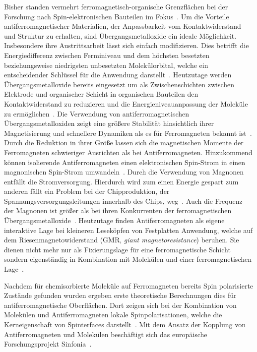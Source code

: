     Bisher standen vermehrt ferromagnetisch-organische Grenzflächen bei der Forschung nach Spin-elektronischen Bauteilen im Fokus~\cite{ma-DJ}.
    Um die Vorteile antiferromagnetischer Materialien, der Anpassbarkeit vom Kontaktwiderstand und Struktur zu erhalten, sind Übergangsmetalloxide ein ideale Möglichkeit.
    Insbesondere ihre Austrittsarbeit lässt sich einfach modifizieren.
    Dies betrifft die Energiedifferenz zwischen Ferminiveau und dem höchsten besetzten beziehungsweise niedrigsten unbesetzten Molekülorbital, welche ein entscheidender Schlüssel für die Anwendung darstellt~\cite{5A_4}.
    Heutzutage werden Übergangsmetalloxide bereits eingesetzt um als Zwischenschichten zwischen Elektrode und organischer Schicht in organischen Bauteilen den Kontaktwiderstand zu reduzieren und die Energieniveauanpassung der Moleküle zu ermöglichen~\cite{IF_11}.
    Die Verwendung von antiferromagnetischen Übergangsmetalloxiden zeigt eine größere Stabilität hinsichtlich ihrer Magnetisierung und schnellere Dynamiken als es für Ferromagneten bekannt ist~\cite{AFM_1}.
    Durch die Reduktion in ihrer Größe lassen sich die magnetischen Momente der Ferromagneten schwieriger Ausrichten als bei Antiferromagneten.
    Hinzukommend können isolierende Antiferromagneten einen elektronischen Spin-Strom in einen magnonischen Spin-Strom umwandeln~\cite{AFM_1}.
    Durch die Verwendung von Magnonen entfällt die Stromversorgung.
    Hierdurch wird zum einen Energie gespart zum anderen fällt ein Problem bei der Chipproduktion, der Spannungsversorgungsleitungen innerhalb des Chips, weg~\cite{AFM_3}.
    Auch die Frequenz der Magnonen ist größer als bei ihren Konkurrenten der ferromagnetischen Übergangsmetalloxide~\cite{AFM_5}.
    Heutzutage finden Antiferromagneten als eigene interaktive Lage bei kleineren Leseköpfen von Festplatten Anwendung, welche auf dem Riesenmagnetowiderstand (GMR, \textit{giant magnetoresistance}) beruhen.
    Sie dienen nicht mehr nur als Fixierungslage für eine ferromagnetische Schicht sondern eigenständig in Kombination mit Molekülen und einer ferromagnetischen Lage~\cite{bagrets_single_2012}.

    Nachdem für chemisorbierte Moleküle auf Ferromagneten bereits Spin polarisierte Zustände gefunden wurden \cite{IF_16} ergeben erste theoretische Berechnungen dies für antiferromagnetische Oberflächen.
    Dort zeigen sich bei der Kombination von Molekülen und Antiferromagneten lokale Spinpolarisationen, welche die Kerneigenschaft von Spinterfaces darstellt~\cite{AFM_2}.
    Mit dem Ansatz der Kopplung von Antiferromagneten und Molekülen beschäftigt sich das europäische Forschungsprojekt Sinfonia~\cite{SINFONIA}.

